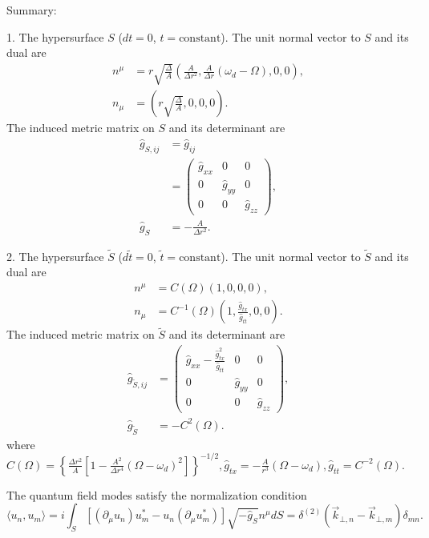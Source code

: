 \documentclass[english]{article}
\begin{document}
Summary:

1. The hypersurface $S$ ($dt=0$, $t=\text{constant}$). The unit
normal vector to $S$ and its dual are 
\begin{align*}
n^{\mu} & =r\sqrt{\frac{\Delta}{A}}\left(\frac{A}{\Delta r^{2}},\frac{A}{\Delta r}\left(\omega_{d}-\Omega\right),0,0\right),\\
n_{\mu} & =\left(r\sqrt{\frac{\Delta}{A}},0,0,0\right).
\end{align*}
 The induced metric matrix on $S$ and its determinant are 
\begin{align*}
\hat{g}_{S,ij} & =\hat{g}_{ij}\\
 & =\begin{pmatrix}\hat{g}_{xx} & 0 & 0\\
0 & \hat{g}_{yy} & 0\\
0 & 0 & \hat{g}_{zz}
\end{pmatrix},\\
\hat{g}_{S} & =-\frac{A}{\Delta r^{2}}.
\end{align*}

2. The hypersurface $\tilde{S}$ ($d\tilde{t}=0$, $\tilde{t}=\text{constant}$).
The unit normal vector to $\tilde{S}$ and its dual are 
\begin{align*}
n^{\mu} & =C\left(\Omega\right)\left(1,0,0,0\right),\\
n_{\mu} & =C^{-1}\left(\Omega\right)\left(1,\frac{\hat{g}_{tx}}{\hat{g}_{tt}},0,0\right).
\end{align*}
 The induced metric matrix on $\tilde{S}$ and its determinant are
\begin{align*}
\hat{g}_{\tilde{S},ij} & =\begin{pmatrix}\hat{g}_{xx}-\frac{\hat{g}^{2}_{tx}}{\hat{g}_{tt}} & 0 & 0\\
0 & \hat{g}_{yy} & 0\\
0 & 0 & \hat{g}_{zz}
\end{pmatrix},\\
\hat{g}_{\tilde{S}} & =-C^{2}\left(\Omega\right).
\end{align*}
 where $C\left(\Omega\right)=\left\{ \frac{\Delta r^{2}}{A}\left[1-\frac{A^{2}}{\Delta r^{4}}\left(\Omega-\omega_{d}\right)^{2}\right]\right\} ^{-1/2},\hat{g}_{tx}=-\frac{A}{r^{3}}\left(\Omega-\omega_{d}\right),\hat{g}_{tt}=C^{-2}\left(\Omega\right)$.

The quantum field modes satisfy the normalization condition 
\[
\langle u_{n},u_{m}\rangle=i\int_{S}\left[\left(\partial_{\mu}u_{n}\right)u^{*}_{m}-u_{n}\left(\partial_{\mu}u^{*}_{m}\right)\right]\sqrt{-\hat{g}_{S}}n^{\mu}dS=\delta^{(2)}\left(\vec{k}_{\bot,n}-\vec{k}_{\bot,m}\right)\delta_{mn}.
\]
\end{document}
